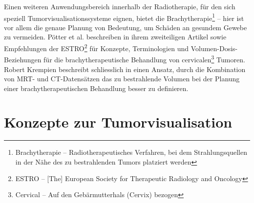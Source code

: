 \documentclass[ngerman,pdftex,paper=A4,DIV=calc,titlepage,12pt]{scrartcl}
\newtheorem[L]{boxedDefinition}{Definition}
\begin{document}
\begin{itemize}
 Einen weiteren Anwendungsbereich innerhalb der Radiotherapie, für den sich speziell Tumorvisualisationssysteme eignen, bietet die Brachytherapie\footnote{Brachytherapie -- Radiotherapeutisches Verfahren, bei dem Strahlungsquellen in der Nähe des zu bestrahlenden Tumors platziert werden} -- hier ist vor allem die genaue Planung von Bedeutung, um Schäden an gesundem Gewebe zu vermeiden.
 Pötter et al. beschreiben in ihrem zweiteiligen Artikel \cite{Poetter2005} sowie \cite{Poetter2006} Empfehlungen der ESTRO\footnote{ESTRO -- [The] European Society for Therapeutic Radiology and Oncology} für Konzepte, Terminologien und Volumen-Dosis-Beziehungen für die brachytherapeutische Behandlung von cervicalen\footnote{Cervical -- Auf den Gebärmutterhals (Cervix) bezogen} Tumoren. Robert Krempien beschreibt schliesslich in \cite{Krempien2003} einen Ansatz, durch die Kombination von MRT- und CT-Datensätzen das zu bestrahlende Volumen bei der Planung einer brachytherapeutischen Behandlung besser zu definieren.
\end{itemize}

\section{Konzepte zur Tumorvisualisation}\label{ssec:concepts}
\end{document}
